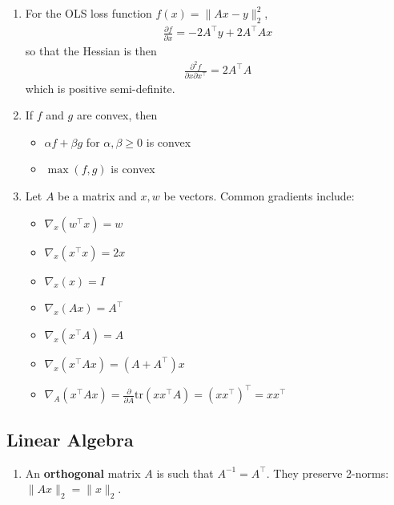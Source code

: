 \documentclass[10pt]{article}
\begin{document}
\begin{multicols}{2}
\begin{addmargin}[0.8em]{0.5em}
\begin{enumerate}[label=(\alph*)]
        \item For the OLS loss function $f(x) = \|Ax-y\|_2^2$,
        \begin{align*}
        \frac{\partial f}{\partial x} = -2A^\top y + 2 A^\top A x
        \end{align*}
        so that the Hessian is then
        \begin{align*}
        \frac{\partial^2 f}{\partial x \partial x^\top} = 2 A^\top A
        \end{align*}
        which is positive semi-definite.
        
        \item If $f$ and $g$ are convex, then
        \begin{itemize}
        \item $\alpha f + \beta g$ for $\alpha, \beta \geq 0$ is convex
        \item $\max(f,g)$ is convex
        \end{itemize}
        
        \item Let $A$ be a matrix and $x, w$ be vectors. Common gradients include:
        \begin{itemize}
        \item $\nabla_{x} ( w^\top x ) = w$
        \item $\nabla_{x} ( x^\top x ) = 2x$
        \item $\nabla_{x} ( x ) = I$
        \item $\nabla_{x} ( Ax ) = A^\top $
        \item $\nabla_{x} ( x^\top A ) = A$
        \item $\nabla_{x} ( x^\top Ax ) = (A + A^\top)x$
        \item $\nabla_{A} ( x^\top Ax ) = \frac{\partial}{\partial A} \text{tr}(x x^\top A) = (x x^\top)^\top = x x^\top$
        \end{itemize}
    \end{enumerate}
    \vspace{-0.9cm}
    \subsection{Linear Algebra}
    \vspace{-0.3cm}
    \begin{enumerate}[label=(\alph*)]
        \item An \textbf{orthogonal} matrix $A$ is such that $A^{-1} = A^\top$. They preserve 2-norms: $\| Ax \|_2 = \| x \|_2$.
        

\end{enumerate}
\end{addmargin}
\end{multicols}
\end{document}
